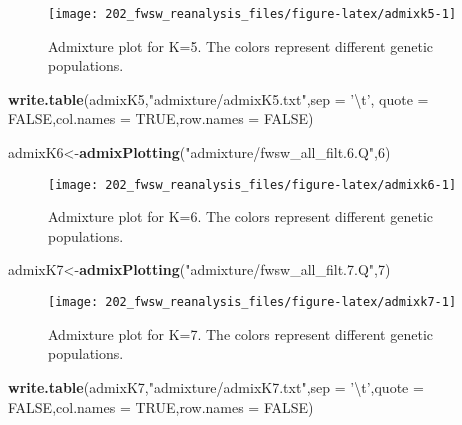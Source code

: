 \documentclass[11pt,]{article}
\newenvironment{Shaded}{\begin{snugshade}}{\end{snugshade}}
\newcommand{\KeywordTok}[1]{\textcolor[rgb]{0.13,0.29,0.53}{\textbf{#1}}}
\newcommand{\DataTypeTok}[1]{\textcolor[rgb]{0.13,0.29,0.53}{#1}}
\newcommand{\DecValTok}[1]{\textcolor[rgb]{0.00,0.00,0.81}{#1}}
\newcommand{\CharTok}[1]{\textcolor[rgb]{0.31,0.60,0.02}{#1}}
\newcommand{\StringTok}[1]{\textcolor[rgb]{0.31,0.60,0.02}{#1}}
\newcommand{\OtherTok}[1]{\textcolor[rgb]{0.56,0.35,0.01}{#1}}
\newcommand{\NormalTok}[1]{#1}
\begin{document}
\begin{figure}[H]
\texttt{[image: 202\_fwsw\_reanalysis\_files/figure-latex/admixk5-1]} \caption{Admixture plot for K=5. The colors represent different genetic populations.}\label{fig:admixk5}
\end{figure}

\begin{Shaded}
\begin{Highlighting}[]
\KeywordTok{write.table}\NormalTok{(admixK5,}\StringTok{"admixture/admixK5.txt"}\NormalTok{,}\DataTypeTok{sep =} \StringTok{'}\CharTok{\textbackslash{}t}\StringTok{'}\NormalTok{,}
            \DataTypeTok{quote =} \OtherTok{FALSE}\NormalTok{,}\DataTypeTok{col.names =} \OtherTok{TRUE}\NormalTok{,}\DataTypeTok{row.names =} \OtherTok{FALSE}\NormalTok{)}
\end{Highlighting}
\end{Shaded}

\begin{Shaded}
\begin{Highlighting}[]
\NormalTok{admixK6<-}\KeywordTok{admixPlotting}\NormalTok{(}\StringTok{"admixture/fwsw_all_filt.6.Q"}\NormalTok{,}\DecValTok{6}\NormalTok{)}
\end{Highlighting}
\end{Shaded}

\begin{figure}[H]
\texttt{[image: 202\_fwsw\_reanalysis\_files/figure-latex/admixk6-1]} \caption{Admixture plot for K=6. The colors represent different genetic populations.}\label{fig:admixk6}
\end{figure}

\begin{Shaded}
\begin{Highlighting}[]
\NormalTok{admixK7<-}\KeywordTok{admixPlotting}\NormalTok{(}\StringTok{"admixture/fwsw_all_filt.7.Q"}\NormalTok{,}\DecValTok{7}\NormalTok{)}
\end{Highlighting}
\end{Shaded}

\begin{figure}[H]
\texttt{[image: 202\_fwsw\_reanalysis\_files/figure-latex/admixk7-1]} \caption{Admixture plot for K=7. The colors represent different genetic populations.}\label{fig:admixk7}
\end{figure}

\begin{Shaded}
\begin{Highlighting}[]
\KeywordTok{write.table}\NormalTok{(admixK7,}\StringTok{"admixture/admixK7.txt"}\NormalTok{,}\DataTypeTok{sep =} \StringTok{'}\CharTok{\textbackslash{}t}\StringTok{'}\NormalTok{,}\DataTypeTok{quote =} \OtherTok{FALSE}\NormalTok{,}\DataTypeTok{col.names =} \OtherTok{TRUE}\NormalTok{,}\DataTypeTok{row.names =} \OtherTok{FALSE}\NormalTok{)}
\end{Highlighting}
\end{Shaded}
\end{document}
